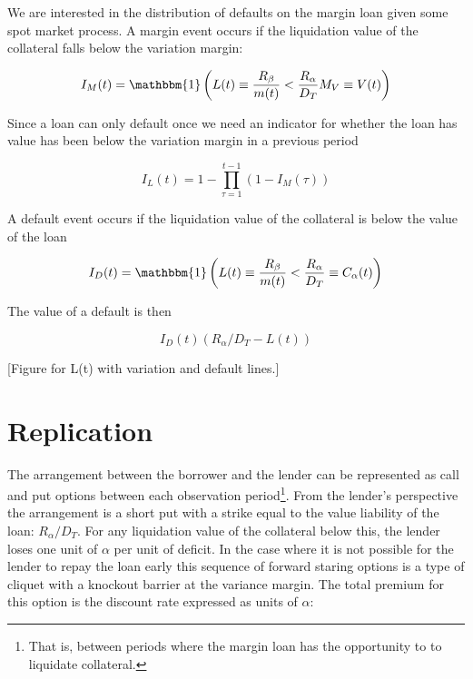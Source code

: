 \documentclass[12pt]{article}
\begin{document}
We are interested in the distribution of defaults on the margin loan given some spot market process. A margin event occurs if the liquidation value of the collateral falls below the variation margin:

\begin{equation} \label{IM}
    I_M(t) = \mathbbm{1} \left( L(t) \equiv \frac{R_\beta}{m(t)} < \frac{R_\alpha}{D_T} M_V \equiv V(t) \right)
\end{equation}

Since a loan can only default once we need an indicator for whether the loan has value has been below the variation margin in a previous period

\begin{equation} \label{IL}
    I_L(t) = 1-\prod_{\tau=1}^{t-1} \left(1-I_M(\tau) \right)
\end{equation}

A default event occurs if the liquidation value of the collateral is below the value of the loan

\begin{equation} \label{ID}
    I_D(t) = \mathbbm{1} \left( L(t) \equiv \frac{R_\beta}{m(t)} < \frac{R_\alpha}{D_T}  \equiv C_\alpha(t)\right)
\end{equation}

The value of a default is then

\begin{equation}
    I_D(t) ( R_\alpha / D_T - L(t))
\end{equation}


[Figure for L(t) with variation and default lines.]

\section{Replication}

The arrangement between the borrower and the lender can be represented as call and put options between each observation period\footnote{That is, between periods where the margin loan has the opportunity to to liquidate collateral.}. From the lender's perspective the arrangement is a short put with a strike equal to the value liability of the loan: $R_\alpha/D_T$. For any liquidation value of the collateral below this, the lender loses one unit of $\alpha$ per unit of deficit. In the case where it is not possible for the lender to repay the loan early this sequence of forward staring options is a type of cliquet with a knockout barrier at the variance margin. The total premium for this option is the discount rate expressed as units of $\alpha$:
\end{document}
